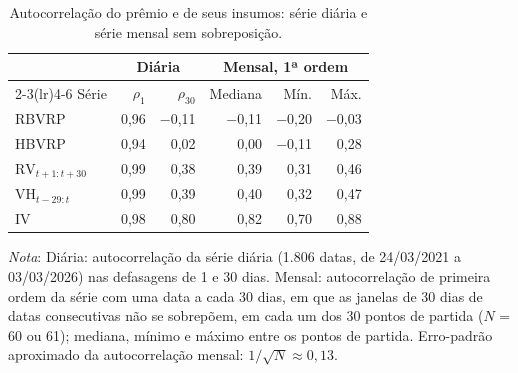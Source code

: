 \begin{table}[H]
\centering
\small
\caption{Autocorrelação do prêmio e de seus insumos: série diária e série mensal sem sobreposição.}
\label{tab:dados-acf-mensal}
\begin{tabular}{lrrrrr}
\toprule
 & \multicolumn{2}{c}{Diária} & \multicolumn{3}{c}{Mensal, 1ª ordem} \\ \cmidrule(lr){2-3}\cmidrule(lr){4-6}
Série & $\rho_1$ & $\rho_{30}$ & Mediana & Mín. & Máx. \\
\midrule
RBVRP & 0,96 & $-$0,11 & $-$0,11 & $-$0,20 & $-$0,03 \\
HBVRP & 0,94 & 0,02 & 0,00 & $-$0,11 & 0,28 \\
$\text{RV}_{t+1:t+30}$ & 0,99 & 0,38 & 0,39 & 0,31 & 0,46 \\
$\text{VH}_{t-29:t}$ & 0,99 & 0,39 & 0,40 & 0,32 & 0,47 \\
IV & 0,98 & 0,80 & 0,82 & 0,70 & 0,88 \\
\bottomrule
\end{tabular}
\par\smallskip
\parbox{0.95\linewidth}{\footnotesize\textit{Nota}: Diária: autocorrelação da série diária (1.806 datas, de 24/03/2021 a 03/03/2026) nas defasagens de 1 e 30 dias. Mensal: autocorrelação de primeira ordem da série com uma data a cada 30 dias, em que as janelas de 30 dias de datas consecutivas não se sobrepõem, em cada um dos 30 pontos de partida ($N$ = 60 ou 61); mediana, mínimo e máximo entre os pontos de partida. Erro-padrão aproximado da autocorrelação mensal: $1/\sqrt{N} \approx 0,13$.}
\end{table}
